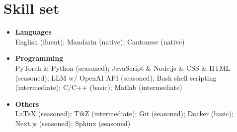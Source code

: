\documentclass[letterpaper,11pt]{article}
\begin{document}
    \section{Skill set}

    \begin{itemize}[leftmargin=0.15in, label={}, itemsep=0em]
        \item \textbf{Languages}\\
        English (fluent); Mandarin (native); Cantonese (native)
        \item \textbf{Programming}\\
        PyTorch \& Python (seasoned); JavaScript \& Node.js \& CSS \& HTML (seasoned); LLM w/ OpenAI API (seasoned); Bash shell scripting (intermediate); C/C++ (basic); Matlab (intermediate)
        \item \textbf{Others}\\
        LaTeX (seasoned); TikZ (intermediate); Git (seasoned); Docker (basic); Next.js (seasoned); Sphinx (seasoned)
    \end{itemize}
\end{document}
